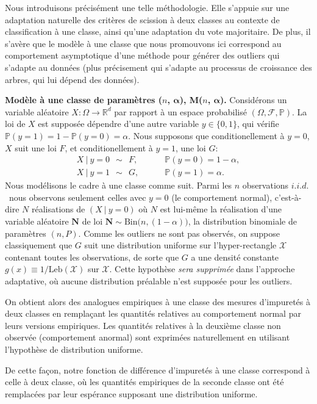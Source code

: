 \documentclass[a4paper, 12pt]{article}
\newcommand\iid{\ensuremath{\mathit{i.i.d.}}\ }
\def\mb{\mathbf}
\def\leb{\text{Leb}}
\begin{document}
Nous introduisons précisément une telle méthodologie. Elle s'appuie sur une adaptation naturelle des critères de scission à deux classes au contexte de classification à une classe, ainsi qu'une adaptation du vote majoritaire. De plus, il s'avère que le modèle à une classe que nous promouvons ici correspond au comportement asymptotique d'une méthode pour générer des outliers qui s'adapte au données (plus précisement qui s'adapte au processus de croissance des arbres, qui lui dépend des données).

\textbf{Modèle à une classe de paramètres ($n$, $\boldsymbol{\alpha}$), M($n$, $\boldsymbol{\alpha}$).}
Considérons un variable aléatoire $ X:\Omega \to \mathbb{R}^d$ par rapport à un espace probabilisé $(\Omega, \mathcal{F}, \mathbb{P})$.
La loi de $X$ est supposée dépendre d'une autre variable $y \in \{0,1\}$, qui vérifie $\mathbb{P}(y=1)=1-\mathbb{P}(y=0)=\alpha$. Nous supposons que conditionellement à $y=0$, $X$ suit une loi $F$, et conditionellement à $y=1$, une loi $G$:
\begin{align*}
 X ~|~ y=0 ~~\sim~~ F, &~~~~~~~~~~  \mathbb{P}(y=0)=1-\alpha, \\
 X ~|~ y=1 ~~\sim~~ G, &~~~~~~~~~~  \mathbb{P}(y=1)=\alpha.
\end{align*}
%
Nous modélisons le cadre à une classe comme suit. Parmi les $n$ observations \iid nous observons seulement celles avec $y = 0$ (le comportement normal), c'est-à-dire $N$ réalisations de $ (X ~ | ~ y = 0)$ où $N$ est lui-même la réalisation d'une variable aléatoire $\mb N$ de loi $\mb N \sim \text{Bin}\big(n, (1-\alpha)\big)$, la distribution binomiale de paramètres $ (n, P)$. Comme les outliers ne sont pas observés, on suppose classiquement que $G$ suit une distribution uniforme sur l'hyper-rectangle $ \mathcal{X} $ contenant toutes les observations, de sorte que $ G $ a une densité constante $g(x) \equiv 1 / \leb(\mathcal{X})$ sur $\mathcal{X}$. Cette hypothèse \emph{sera supprimée} dans l'approche adaptative, où aucune distribution préalable n'est supposée pour les outliers.

On obtient alors des analogues empiriques à une classe des mesures d'impuretés à deux classes en remplaçant les quantités relatives au comportement normal par leurs versions empiriques. Les quantités relatives à la deuxième classe non observée (comportement anormal) sont exprimées naturellement en utilisant l'hypothèse de distribution uniforme.

De cette façon, notre fonction de différence d'impuretés à une classe correspond à celle à deux classe, où les quantités empiriques de la seconde classe ont été remplacées par leur espérance supposant une distribution uniforme.
\end{document}
